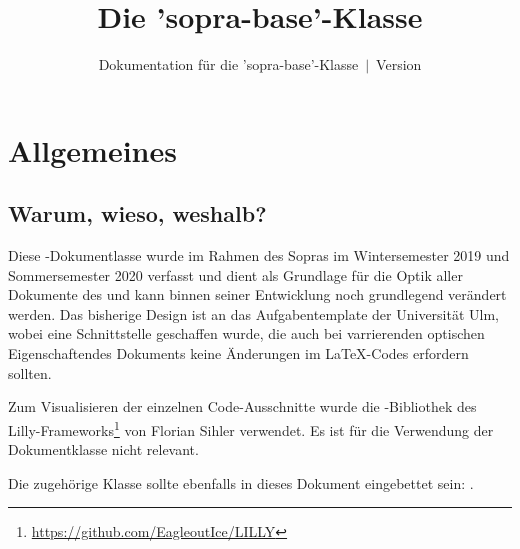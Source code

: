 \documentclass{sopra-base}
\title{Die 'sopra-base'-Klasse}
\subtitle[Dokumentation für die 'sopra-base'-Klasse]{Dokumentation für die 'sopra-base'-Klasse~$\mid$~Version \thesobversion}
\begin{document}
    \maketitle%
%
%

%
%
%
%

\section{Allgemeines}
\subsection{Warum, wieso, weshalb?}
    Diese \LaTeXe-Dokumentlasse wurde im Rahmen des Sopras im 
    Wintersemester 2019 und Sommersemester 2020 verfasst und dient als
    Grundlage für die Optik aller Dokumente des  und kann
    binnen seiner Entwicklung noch grundlegend verändert werden. Das
    bisherige Design ist an das Aufgabentemplate der Universität Ulm, wobei
    eine Schnittstelle geschaffen wurde, die auch bei varrierenden optischen
    Eigenschaftendes Dokuments keine Änderungen im \LaTeX-Codes erfordern 
    sollten.\par
    Zum Visualisieren der einzelnen Code-Ausschnitte wurde die 
    -Bibliothek des 
    Lilly-Frameworks\footnote{\url{https://github.com/EagleoutIce/LILLY}} von
    Florian Sihler verwendet. Es ist für die Verwendung der Dokumentklasse
    nicht relevant.\par
    Die zugehörige Klasse sollte ebenfalls in dieses Dokument eingebettet sein: .
\end{document}
